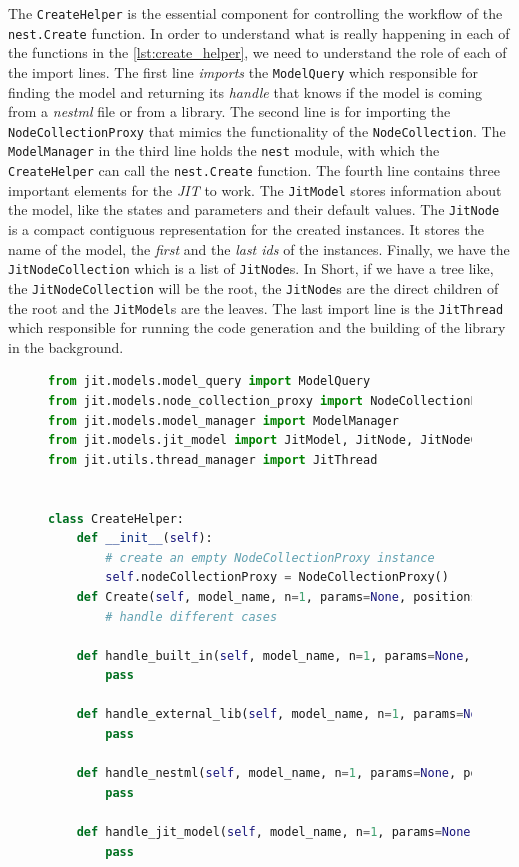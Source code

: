 The \texttt{CreateHelper} is the essential component for controlling the workflow of the \texttt{nest.Create} function. In order to understand what is really happening in each of the functions in the \autoref{lst:create_helper}, we need to understand the role of each of the import lines. The first line \emph{imports} the \texttt{ModelQuery} which responsible for finding the model and returning its \emph{handle} that knows if the model is coming from a \emph{nestml} file or from a library. The second line is for importing the \texttt{NodeCollectionProxy} that mimics the functionality of the \texttt{NodeCollection}. The \texttt{ModelManager} in the third line holds the \texttt{nest} module, with which the \texttt{CreateHelper} can call the \texttt{nest.Create} function. The fourth line contains three important elements for the \emph{JIT} to work. The \texttt{JitModel} stores information about the model, like the states and parameters and their default values. The \texttt{JitNode} is a compact contiguous representation for the created instances. It stores the name of the model, the \emph{first} and the \emph{last ids} of the instances. Finally, we have the \texttt{JitNodeCollection} which is a list of \texttt{JitNode}s. In Short, if we have a tree like, the \texttt{JitNodeCollection} will be the root, the \texttt{JitNode}s are the direct children of the root and the \texttt{JitModel}s are the leaves. The last import line is the \texttt{JitThread} which responsible for running the code generation and the building of the library in the background.
\begin{figure}[ht!]
    \centering
    \begin{lstlisting}[language=Python, label=lst:create_helper, caption={The CreateHelper}]
from jit.models.model_query import ModelQuery
from jit.models.node_collection_proxy import NodeCollectionProxy
from jit.models.model_manager import ModelManager
from jit.models.jit_model import JitModel, JitNode, JitNodeCollection
from jit.utils.thread_manager import JitThread


class CreateHelper:
    def __init__(self):
        # create an empty NodeCollectionProxy instance
        self.nodeCollectionProxy = NodeCollectionProxy()
    def Create(self, model_name, n=1, params=None, positions=None):
        # handle different cases
        
    def handle_built_in(self, model_name, n=1, params=None, positions=None):
        pass
        
    def handle_external_lib(self, model_name, n=1, params=None, positions=None):
        pass
    
    def handle_nestml(self, model_name, n=1, params=None, positions=None): 
        pass
        
    def handle_jit_model(self, model_name, n=1, params=None, positions=None):
        pass
    
\end{lstlisting}
\end{figure}

